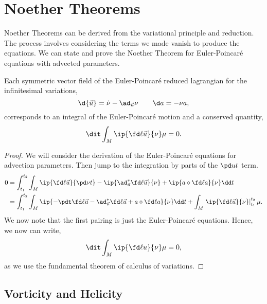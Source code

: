 \section{Noether Theorems}
Noether Theorems can be derived from the variational principle and reduction. The process involves considering the terms we made vanish to produce the equations. We can state and prove the Noether Theorem for Euler-Poincar\'e equations with advected parameters.
\begin{nthm}
  Each symmetric vector field of the Euler-Poincar\'e reduced lagrangian for the infinitesimal variations,
  $$ \d {\vec u} = \dot \nu - \ad_{\vec u} \nu \qquad \d a = -\nu a, $$
  corresponds to an integral of the Euler-Poincar\'e motion and a conserved quantity,
  $$ \dit \int_{M} \ip{\fd \ell {\vec u}}{\nu}\mu = 0. $$
  \label{thm:n_ep_ap}
\end{nthm}
\begin{proof}
  We will consider the derivation of the Euler-Poincar\'e equations for advection parameters. Then jump to the integration by parts of the $\pd u t$ term.
  \begin{align*}
    0 &= \int_{t_1}^{t_2} \int_M \ip{\fd \ell {\vec u}}{\pd \nu t} - \ip{\ad^*_{\vec u} \fd \ell {\vec u}}{\nu} + \ip{a \diamond \fd \ell a}{\nu} \dd t \\
    &= \int_{t_1}^{t_2} \int_M \ip{-\pdt\fd \ell {\vec u} - \ad^*_{\vec u} \fd \ell {\vec u} + a \diamond \fd \ell a}{\nu} \dd t + \int_M\left. \ip{\fd \ell {\vec u}}{\nu}\right|_{t_1}^{t_2} \mu.
  \end{align*}
  We now note that the first pairing is just the Euler-Poincar\'e equations. Hence, we now can write,
  $$ \dit \int_M \ip{\fd \ell u}{\nu} \mu = 0,$$
  as we use the fundamental theorem of calculus of variations.
\end{proof}

\subsection{Vorticity and Helicity}

